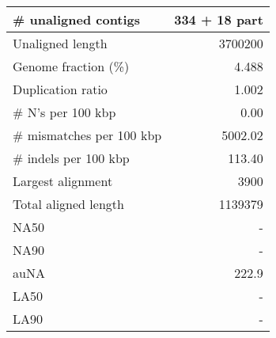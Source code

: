 \documentclass[12pt,a4paper]{article}
\begin{document}
\begin{table}[ht]
\begin{center}
\begin{tabular}{|l*{1}{|r}|}
\# unaligned contigs & 334 + 18 part \\ \hline
Unaligned length & 3700200 \\ \hline
Genome fraction (\%) & 4.488 \\ \hline
Duplication ratio & 1.002 \\ \hline
\# N's per 100 kbp & 0.00 \\ \hline
\# mismatches per 100 kbp & 5002.02 \\ \hline
\# indels per 100 kbp & 113.40 \\ \hline
Largest alignment & 3900 \\ \hline
Total aligned length & 1139379 \\ \hline
NA50 & - \\ \hline
NA90 & - \\ \hline
auNA & 222.9 \\ \hline
LA50 & - \\ \hline
LA90 & - \\ \hline
\end{tabular}
\end{center}
\end{table}
\end{document}
